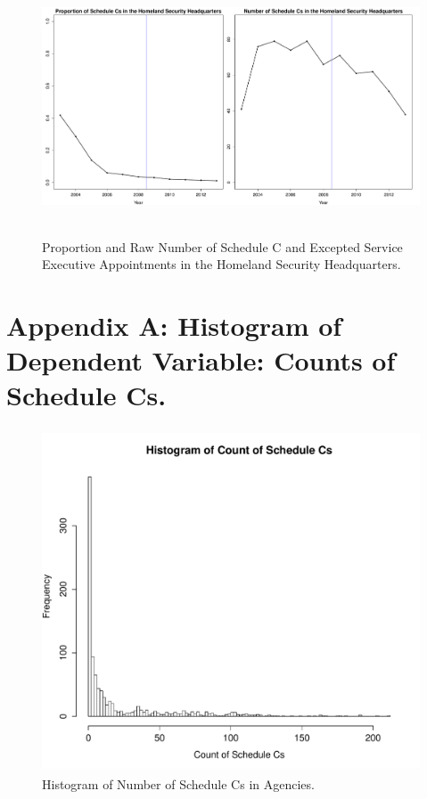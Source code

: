 \documentclass[12pt]{article}
\begin{document}
\newpage
\begin{figure}[!h]
\begin{center}
\includegraphics[height=3in,width=6in]{DHSProportionRawNumber.pdf}
\caption{Proportion and Raw Number of Schedule C and Excepted Service Executive Appointments in the Homeland Security Headquarters.}
\end{center}
\end{figure}

\newpage
\section*{Appendix A: Histogram of Dependent Variable: Counts of Schedule Cs.}
\begin{figure}[!h]
\begin{center}
\includegraphics[height=4in,width=5in]{HistogramScheduleCCount.pdf}
\caption{Histogram of Number of Schedule Cs in Agencies.}
\end{center}
\end{figure}
\end{document}
